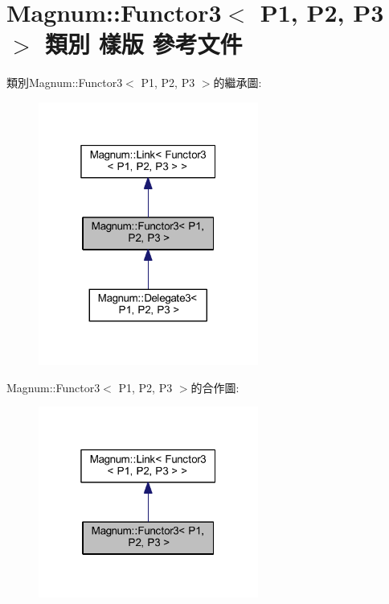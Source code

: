\hypertarget{class_magnum_1_1_functor3}{}\section{Magnum\+:\+:Functor3$<$ P1, P2, P3 $>$ 類別 樣版 參考文件}
\label{class_magnum_1_1_functor3}


類別\+Magnum\+:\+:Functor3$<$ P1, P2, P3 $>$的繼承圖\+:\nopagebreak
\begin{figure}[H]
\begin{center}
\leavevmode
\includegraphics[width=205pt]{class_magnum_1_1_functor3__inherit__graph}
\end{center}
\end{figure}


Magnum\+:\+:Functor3$<$ P1, P2, P3 $>$的合作圖\+:\nopagebreak
\begin{figure}[H]
\begin{center}
\leavevmode
\includegraphics[width=205pt]{class_magnum_1_1_functor3__coll__graph}
\end{center}
\end{figure}
